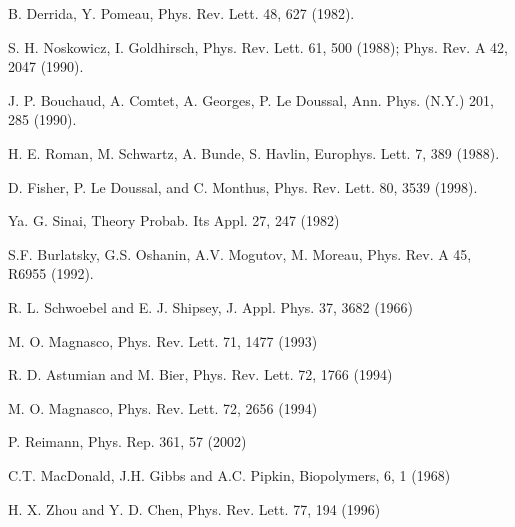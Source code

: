 \documentclass[aps,pre,floats,floatfix,twocolumn]{revtex4}
\begin{document}


\begin{thebibliography}{99}

B. Derrida, Y. Pomeau, 
Phys. Rev. Lett. 48, 627 (1982).

S. H. Noskowicz, I. Goldhirsch,
Phys. Rev. Lett. 61, 500 (1988); 
Phys. Rev. A 42, 2047 (1990). 

J. P. Bouchaud, A. Comtet, A. Georges, P. Le Doussal,
Ann. Phys. (N.Y.) 201, 285 (1990).

H. E. Roman, M. Schwartz, A. Bunde, S. Havlin, 
Europhys. Lett. 7, 389 (1988). 

D. Fisher, P. Le Doussal, and C. Monthus, 
Phys. Rev. Lett. 80, 3539 (1998).

Ya. G. Sinai, 
Theory Probab. Its Appl. 27, 247 (1982)

S.F. Burlatsky, G.S. Oshanin, A.V. Mogutov, M. Moreau,   
Phys. Rev. A 45, R6955 (1992). 



R. L. Schwoebel and E. J. Shipsey, J. Appl. Phys. 37, 3682 (1966) 

M. O. Magnasco, Phys. Rev. Lett. 71, 1477 (1993) 

R. D. Astumian and M. Bier, Phys. Rev. Lett. 72, 1766 (1994)

M. O. Magnasco, Phys. Rev. Lett. 72, 2656 (1994)

P. Reimann, Phys. Rep. 361, 57 (2002)

C.T. MacDonald, J.H. Gibbs and A.C. Pipkin, Biopolymers, 6, 1 (1968)

H. X. Zhou and Y. D. Chen, Phys. Rev. Lett. 77, 194 (1996) 


\end{thebibliography}
\end{document}
